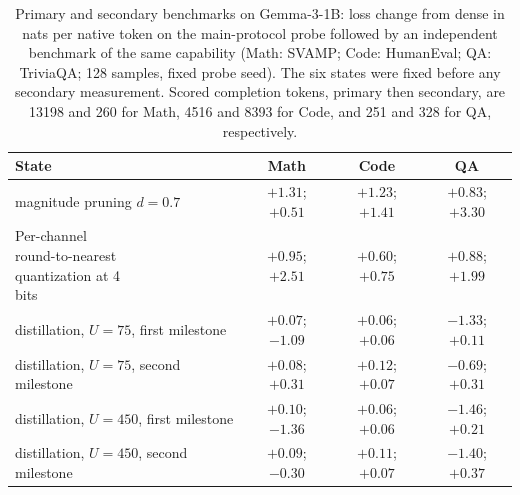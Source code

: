 \begin{table}[!htbp]\normalfont
\centering\small
\caption{Primary and secondary benchmarks on Gemma-3-1B: loss change from dense in nats per native token on the main-protocol probe followed by an independent benchmark of the same capability (Math: SVAMP; Code: HumanEval; QA: TriviaQA; 128 samples, fixed probe seed). The six states were fixed before any secondary measurement. Scored completion tokens, primary then secondary, are 13198 and 260 for Math, 4516 and 8393 for Code, and 251 and 328 for QA, respectively.}
\label{tab:p3_check}
\begin{tabular*}{\textwidth}{@{\extracolsep{\fill}}lccc@{}}
\toprule
State & Math & Code & QA \\
\midrule
magnitude pruning $d=0.7$ & $+1.31$; $+0.51$ & $+1.23$; $+1.41$ & $+0.83$; $+3.30$ \\
\shortstack[l]{Per-channel\\round-to-nearest\\quantization at 4\\bits} & $+0.95$; $+2.51$ & $+0.60$; $+0.75$ & $+0.88$; $+1.99$ \\
distillation, $U=75$, first milestone & $+0.07$; $-1.09$ & $+0.06$; $+0.06$ & $-1.33$; $+0.11$ \\
distillation, $U=75$, second milestone & $+0.08$; $+0.31$ & $+0.12$; $+0.07$ & $-0.69$; $+0.31$ \\
distillation, $U=450$, first milestone & $+0.10$; $-1.36$ & $+0.06$; $+0.06$ & $-1.46$; $+0.21$ \\
distillation, $U=450$, second milestone & $+0.09$; $-0.30$ & $+0.11$; $+0.07$ & $-1.40$; $+0.37$ \\
\bottomrule
\end{tabular*}
\end{table}
